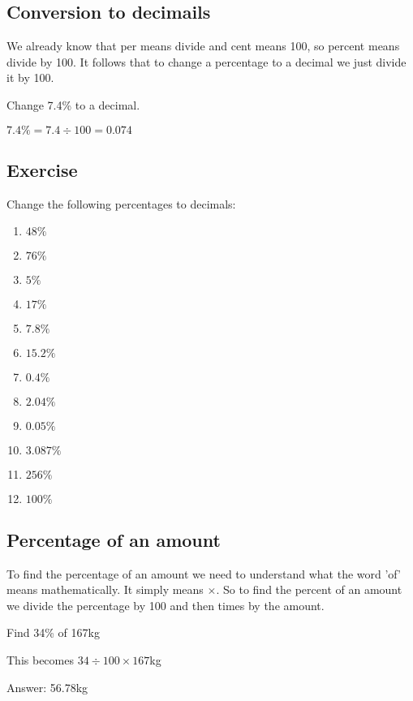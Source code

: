 \subsection{Conversion to decimails}
We already know that per means divide and cent means 100, so percent means divide by 100.  It follows that to change a percentage to a decimal we just divide it by 100.

\begin{exmp}
Change 7.4\% to a decimal.

\bigskip
\noindent $7.4\% = 7.4 \div 100 = 0.074$
\end{exmp}
\subsection{Exercise}
Change the following percentages to decimals:
\begin{multicols}{4}
\begin{enumerate}
	\item $48\%$
	\item $76\%$
	\item $5\%$
	\item $17\%$
	\item $7.8\%$
	\item $15.2\%$
	\item $0.4\%$
	\item $2.04\%$
	\item $0.05\%$
	\item $3.087\%$
	\item $256\%$
	\item $100\%$
\end{enumerate}
\end{multicols}
\subsection{Percentage of an amount}
To find the percentage of an amount we need to understand what the word 'of' means mathematically.  It simply means $\times$.  So to find the percent of an amount we divide the percentage by 100 and then times by the amount.
\begin{exmp}
Find 34\% of 167kg

This becomes $34 \div 100 \times 167$kg

Answer: 56.78kg
\end{exmp}
